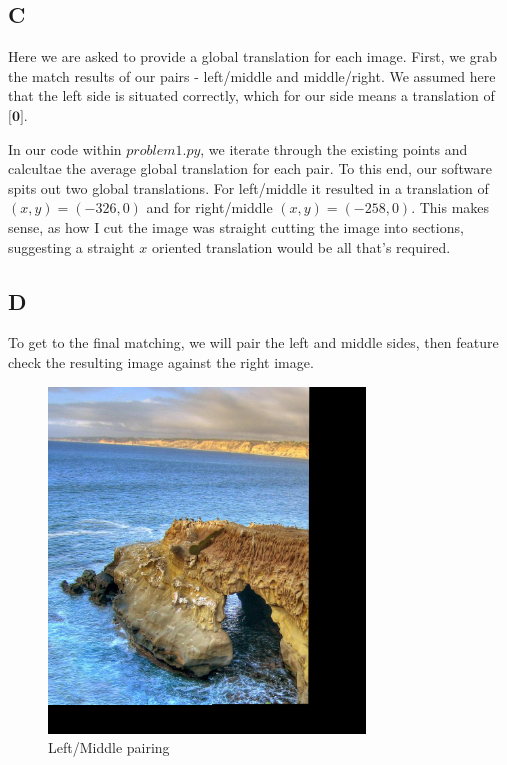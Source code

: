 \documentclass{article}
\begin{document}
\subsection*{C}

Here we are asked to provide a global translation for each image. First, we grab the match results of our pairs - left/middle and middle/right. We assumed here that the left side is situated correctly, which for our side means a translation of $\textbf{[0]}$.

In our code within $problem1.py$, we iterate through the existing points and calcultae the average global translation for each pair. To this end, our software spits out two global translations. For left/middle it resulted in a translation of $(x,y)=(-326,0)$ and for right/middle $(x,y)=(-258,0)$. This makes sense, as how I cut the image was straight cutting the image into sections, suggesting a straight $x$ oriented translation would be all that's required.

\subsection*{D}

To get to the final matching, we will pair the left and middle sides, then feature check the resulting image against the right image.

\begin{figure}[H]
    \centering
    \includegraphics[width = 0.75\textwidth]{imgs/left_middle_match.png}
    \caption{Left/Middle pairing}
    \label{fig:prob1-d-left-middle}
\end{figure}
\end{document}
